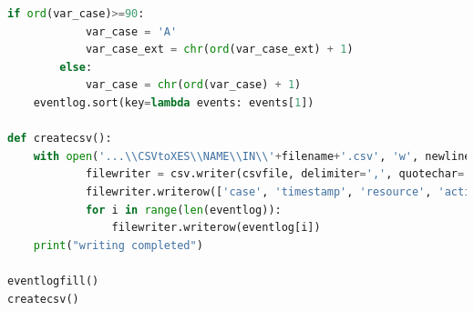 \begin{lstlisting}[language=Python]
        if ord(var_case)>=90:
            var_case = 'A'
            var_case_ext = chr(ord(var_case_ext) + 1)
        else:
            var_case = chr(ord(var_case) + 1)
    eventlog.sort(key=lambda events: events[1])

def createcsv():
    with open('...\\CSVtoXES\\NAME\\IN\\'+filename+'.csv', 'w', newline='') as csvfile:
            filewriter = csv.writer(csvfile, delimiter=',', quotechar='|', quoting=csv.QUOTE_MINIMAL)
            filewriter.writerow(['case', 'timestamp', 'resource', 'activity'])
            for i in range(len(eventlog)):
                filewriter.writerow(eventlog[i])
    print("writing completed")

eventlogfill()
createcsv()
\end{lstlisting}

\clearpage
